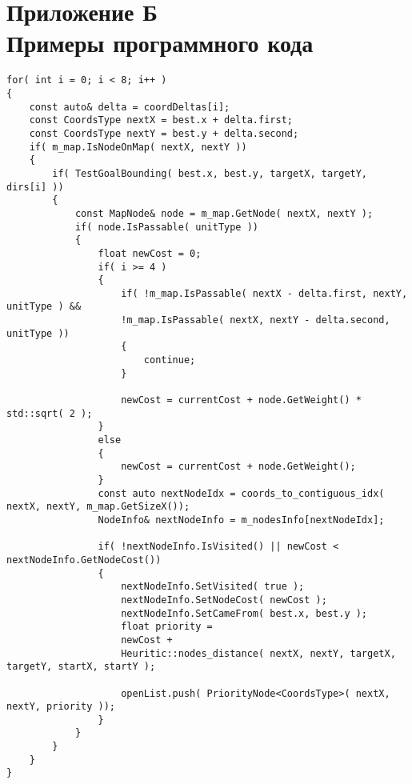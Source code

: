 \section*{Приложение Б \\
	Примеры программного кода }


\begin{lstlisting}
for( int i = 0; i < 8; i++ )
{
	const auto& delta = coordDeltas[i];
	const CoordsType nextX = best.x + delta.first;
	const CoordsType nextY = best.y + delta.second;
	if( m_map.IsNodeOnMap( nextX, nextY ))
	{
		if( TestGoalBounding( best.x, best.y, targetX, targetY, dirs[i] ))
		{
			const MapNode& node = m_map.GetNode( nextX, nextY );
			if( node.IsPassable( unitType ))
			{
				float newCost = 0;
				if( i >= 4 )
				{
					if( !m_map.IsPassable( nextX - delta.first, nextY, unitType ) &&
					!m_map.IsPassable( nextX, nextY - delta.second, unitType ))
					{
						continue;
					}
					
					newCost = currentCost + node.GetWeight() * std::sqrt( 2 );
				}
				else
				{
					newCost = currentCost + node.GetWeight();
				}		
				const auto nextNodeIdx = coords_to_contiguous_idx( nextX, nextY, m_map.GetSizeX());
				NodeInfo& nextNodeInfo = m_nodesInfo[nextNodeIdx];
				
				if( !nextNodeInfo.IsVisited() || newCost < nextNodeInfo.GetNodeCost())
				{
					nextNodeInfo.SetVisited( true );
					nextNodeInfo.SetNodeCost( newCost );
					nextNodeInfo.SetCameFrom( best.x, best.y );
					float priority =
					newCost +
					Heuritic::nodes_distance( nextX, nextY, targetX, targetY, startX, startY );
					
					openList.push( PriorityNode<CoordsType>( nextX, nextY, priority ));
				}
			}
		}
	}
}

\end{lstlisting}
